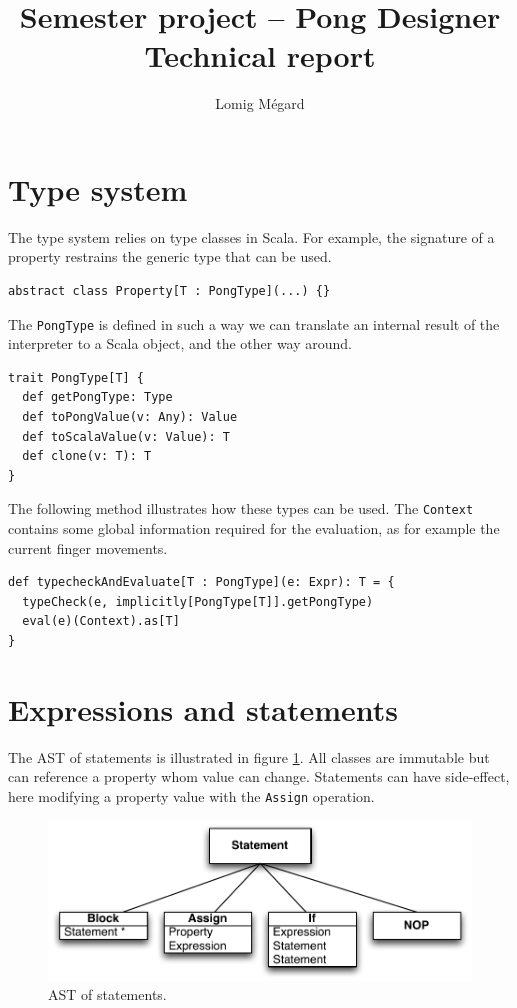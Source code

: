 \documentclass[11pt,a4paper]{article}
\title{Semester project -- Pong Designer\\Technical report}
\author{Lomig Mégard}
\begin{document}
\maketitle

\section{Type system}
The type system relies on type classes in Scala. For example, the signature of a property restrains the generic type that can be used.
\begin{lstlisting}
abstract class Property[T : PongType](...) {}
\end{lstlisting}

The \texttt{PongType} is defined in such a way we can translate an internal result of the interpreter to a Scala object, and the other way around.
\begin{lstlisting}
trait PongType[T] {
  def getPongType: Type
  def toPongValue(v: Any): Value
  def toScalaValue(v: Value): T
  def clone(v: T): T
}
\end{lstlisting}

The following method illustrates how these types can be used. The \texttt{Context} contains some global information required for the evaluation, as for example the current finger movements.
\begin{lstlisting}
def typecheckAndEvaluate[T : PongType](e: Expr): T = {
  typeCheck(e, implicitly[PongType[T]].getPongType)
  eval(e)(Context).as[T]
}
\end{lstlisting}

\clearpage
\section{Expressions and statements}
The AST of statements is illustrated in figure \ref{fig:AST-stats}. All classes are immutable but can reference a property whom value can change. Statements can have side-effect, here modifying a property value with the \texttt{Assign} operation. 

\begin{figure}[h]
\centering
\includegraphics[scale = 0.7]{images/AST_stats} 
\caption{AST of statements.}
\label{fig:AST-stats}
\end{figure}
\end{document}
